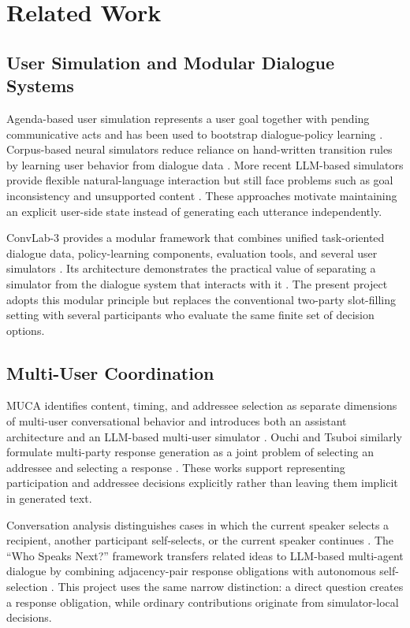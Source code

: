 \section{Related Work}

\subsection{User Simulation and Modular Dialogue Systems}

Agenda-based user simulation represents a user goal together with pending communicative acts and has been used to bootstrap dialogue-policy learning \citep{schatzmann2007agenda}. Corpus-based neural simulators reduce reliance on hand-written transition rules by learning user behavior from dialogue data \citep{kreyssig2018neural}. More recent LLM-based simulators provide flexible natural-language interaction but still face problems such as goal inconsistency and unsupported content \citep{sekulic2024reliable}. These approaches motivate maintaining an explicit user-side state instead of generating each utterance independently.

ConvLab-3 provides a modular framework that combines unified task-oriented dialogue data, policy-learning components, evaluation tools, and several user simulators \citep{zhu2023convlab3}. Its architecture demonstrates the practical value of separating a simulator from the dialogue system that interacts with it \citep{zhu2023convlab3}. The present project adopts this modular principle but replaces the conventional two-party slot-filling setting with several participants who evaluate the same finite set of decision options.

\subsection{Multi-User Coordination}

MUCA identifies content, timing, and addressee selection as separate dimensions of multi-user conversational behavior and introduces both an assistant architecture and an LLM-based multi-user simulator \citep{mao2024muca}. Ouchi and Tsuboi similarly formulate multi-party response generation as a joint problem of selecting an addressee and selecting a response \citep{ouchi2016addressee}. These works support representing participation and addressee decisions explicitly rather than leaving them implicit in generated text.

Conversation analysis distinguishes cases in which the current speaker selects a recipient, another participant self-selects, or the current speaker continues \citep{sacks1974turntaking}. The ``Who Speaks Next?'' framework transfers related ideas to LLM-based multi-agent dialogue by combining adjacency-pair response obligations with autonomous self-selection \citep{nonomura2025whospeaks}. This project uses the same narrow distinction: a direct question creates a response obligation, while ordinary contributions originate from simulator-local decisions.

